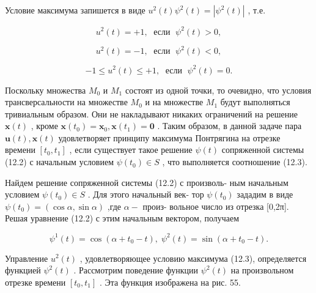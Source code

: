 \documentclass[8pt]{extarticle}
\begin{document}
Условие максимума запишется в виде \({u}^{2}\left( t\right) {\psi }^{2}\left( t\right)  = \left| {{\psi }^{2}\left( t\right) }\right|\) , т.е.

\[
{u}^{2}\left( t\right)  =  + 1,\;\text{ если }\;{\psi }^{2}\left( t\right)  > 0,
\]

\[
{u}^{2}\left( t\right)  =  - 1,\;\text{ если }\;{\psi }^{2}\left( t\right)  < 0, \tag{12.3}
\]

\[
- 1 \leq  {u}^{2}\left( t\right)  \leq   + 1,\;\text{ если }\;{\psi }^{2}\left( t\right)  = 0.
\]

Поскольку множества \({M}_{0}\) и \({M}_{1}\) состоят из одной точки, то очевидно, что условия трансверсальности на множестве \({M}_{0}\) и на множестве \({M}_{1}\) будут выполняться тривиальным образом. Они не накладывают никаких ограничений на решение \(\mathbf{x}\left( t\right)\) , кроме \(\mathbf{x}\left( {t}_{0}\right)  = {\mathbf{x}}_{0},\mathbf{x}\left( {t}_{1}\right)  = \mathbf{0}\) . Таким образом, в данной задаче пара \(\mathbf{u}\left( t\right) ,\mathbf{x}\left( t\right)\) удовлетворяет принципу максимума Понтрягина на отрезке времени \(\left\lbrack  {{t}_{0},{t}_{1}}\right\rbrack\) , если существует такое решение \(\psi \left( t\right)\) сопряженной системы (12.2) с начальным условием \(\psi \left( {t}_{0}\right) \in  S\) , что выполняется соотношение (12.3).

Найдем решение сопряженной системы (12.2) с произволь- ным начальным условием \(\psi \left( {t}_{0}\right)  \in  S\) . Для этого начальный век- тор \(\psi \left( {t}_{0}\right)\) зададим в виде \(\psi \left( {t}_{0}\right)  = \left( {\cos \alpha ,\sin \alpha }\right)\) ,где \(\alpha  -\) произ- вольное число из отрезка [0,2π]. Решая уравнение (12.2) с этим начальным вектором, получаем

\[
{\psi }^{1}\left( t\right)  = \cos \left( {\alpha  + {t}_{0} - t}\right) ,\;{\psi }^{2}\left( t\right)  = \sin \left( {\alpha  + {t}_{0} - t}\right) .
\]

Управление \({u}^{2}\left( t\right)\) , удовлетворяющее условию максимума (12.3), определяется функцией \({\psi }^{2}\left( t\right)\) . Рассмотрим поведение функции \({\psi }^{2}\left( t\right)\) на произвольном отрезке времени \(\left\lbrack  {{t}_{0},{t}_{1}}\right\rbrack\) . Эта функция изображена на рис. 55.
\end{document}
